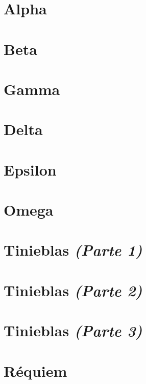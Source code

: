 \documentclass[11pt]{book}
\begin{document}
\chapter{Alpha}


\chapter{Beta}


\chapter{Gamma}


\chapter{Delta}


\chapter{Epsilon}


\chapter{Omega}


\chapter{Tinieblas \emph{\mdseries(Parte 1)}}


\chapter{Tinieblas \emph{\mdseries(Parte 2)}}


\chapter{Tinieblas \emph{\mdseries(Parte 3)}}


\chapter{Réquiem}

\end{document}
